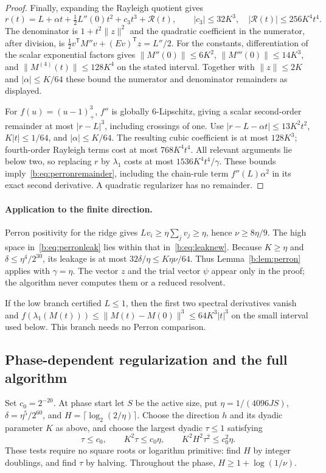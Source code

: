\documentclass[11pt]{amsart}
\theoremstyle{definition}\newtheorem{definition}[theorem]{Definition}
\theoremstyle{remark}\newtheorem{remark}[theorem]{Remark}
\numberwithin{equation}{section}
\newcommand{\T}{\mathsf T}
\begin{document}
\begin{proof}
Finally, expanding the Rayleigh quotient gives
\[
 r(t)=L+\alpha t+\tfrac12L''(0)t^2+c_3t^3+\mathcal R(t),\qquad
 |c_3|\le32K^3,\quad |\mathcal R(t)|\le256K^4t^4.
\]
The denominator is $1+t^2\|z\|^2$ and the quadratic coefficient in the
numerator, after division, is
$\tfrac12v^\T M''v+(Ev)^\T z=L''/2$.
For the constants, differentiation of the scalar exponential factors gives
$\|M''(0)\|\le6K^2$, $\|M'''(0)\|\le14K^3$, and
$\|M^{(4)}(t)\|\le128K^4$ on the stated interval.
Together with $\|z\|\le2K$ and $|\alpha|\le K/64$ these bound the numerator
and denominator remainders as displayed.

For $f(u)=(u-1)_+^3$, $f''$ is globally $6$-Lipschitz, giving a scalar
second-order remainder at most $|r-L|^3$, including crossings of one.
Use $|r-L-\alpha t|\le13K^2t^2$, $K|t|\le1/64$, and $|\alpha|\le K/64$.
The resulting cubic coefficient is at most $128K^3$; fourth-order Rayleigh
terms cost at most $768K^4t^4$. All relevant arguments lie below two, so
replacing $r$ by $\lambda_1$ costs at most $1536K^4t^4/\gamma$.
These bounds imply~\eqref{b:eq:perronremainder}, including the chain-rule term
$f''(L)\alpha^2$ in its exact second derivative. A quadratic regularizer has
no remainder.
\end{proof}

\paragraph{Application to the finite direction.}
Perron positivity for the ridge gives
$Lv_i\ge\eta\sum_jv_j\ge\eta$, hence $\nu\ge8\eta/9$.
The high space in~\eqref{b:eq:perronleak} lies within that in~\eqref{b:eq:leaknew}.
Because $K\ge\eta$ and $\delta\le\eta^4/2^{30}$, its leakage is at most
$32\delta/\eta\le K\eta\nu/64$.
Thus Lemma~\ref{b:lem:perron} applies with $\gamma=\eta$.
The vector $z$ and the trial vector $\psi$ appear only in the proof; the
algorithm never computes them or a reduced resolvent.

If the low branch certified $L\le1$, then the first two spectral derivatives
vanish and
$f(\lambda_1(M(t)))\le\|M(t)-M(0)\|^3\le64K^3|t|^3$
on the small interval used below. This branch needs no Perron comparison.


\subsection{Phase-dependent regularization and the full algorithm}\label{b:sec:progress}
Set $c_0=2^{-20}$. At phase start let $S$ be the active size, put
$\eta=1/(4096JS)$, $\delta=\eta^5/2^{60}$, and
$H=\lceil\log_2(2/\eta)\rceil$.
Choose the direction $h$ and its dyadic parameter $K$ as above, and choose
the largest dyadic $\tau\le1$ satisfying
\begin{equation}\label{b:eq:stepschedule}
 \tau\le c_0,\qquad K^2\tau\le c_0\eta,
 \qquad K^2H^2\tau^2\le c_0^2\eta.
\end{equation}
These tests require no square roots or logarithm primitive: find $H$ by
integer doublings, and find $\tau$ by halving. Throughout the phase,
$H\ge1+\log(1/\nu)$.
\end{document}
